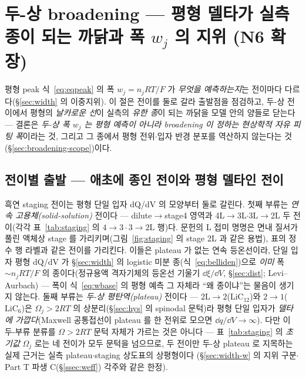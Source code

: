 \section{두-상 broadening --- 평형 델타가 실측 종이 되는 까닭과 폭 $w_j$ 의 지위 (N6 확장)}\label{sec:broadening}
평형 peak 식~\eqref{eq:eqpeak} 의 폭 $w_j=n_jRT/F$ 가 \emph{무엇을 예측하는지}는 전이마다 다르다(\S\ref{sec:width}
의 이중지위). 이 절은
전이를 둘로 갈라 출발점을 점검하고, 두-상 전이에서 평형의 \emph{날카로운 선}이 실측의 \emph{유한 종}이 되는
까닭을 모델 안의 양들로 닫는다 --- 결론은 \emph{두-상 폭 $w_j$ 는 평형 예측이 아니라 broadening 이 정하는
현상학적 자유 피팅 폭}이라는 것, 그리고 그 종에서 평형 전위$\cdot$입자 반경 분포를 역산하지 않는다는
것(\S\ref{sec:broadening-scope})이다.

\subsection{전이별 출발 --- 애초에 종인 전이와 평형 델타인 전이}\label{sec:broadening-class}
흑연 staging 전이는 평형 단일 입자 dQ/dV 의 모양부터
둘로 갈린다. 첫째 부류는 \emph{연속 고용체(solid-solution)} 전이다 --- dilute$\to$stage4 영역과
4L$\to$3L$\cdot$3L$\to$2L 두 전이(각각 표~\ref{tab:staging} 의 $4\!\to\!3\cdot3\!\to\!2\mathrm L$ 행)다. 문헌의 L 접미 명명은 면내 질서가 풀린
액체상 stage 를 가리키며(그림~\ref{fig:staging} 의 stage 2L 과 같은 용법), 표의 정수 행 라벨과 같은 전이를
가리킨다. 이들은 plateau 가 없는 연속 등온선이라\cite{rsc2021}, 단일 입자 평형 dQ/dV 가 \S\ref{sec:width} 의 logistic 미분
종(식~\eqref{eq:belliden})으로 \emph{이미} 폭 $\sim n_jRT/F$ 의 종이다(정규용액 격자기체의 등온선 기울기
$\dd\xi/\dd V$, \S\ref{sec:dist}; Levi--Aurbach\cite{leviaurbach1999}) --- 폭이 식~\eqref{eq:wbase} 의 평형
예측 그 자체라 ``왜 종이냐''는 물음이 생기지 않는다. 둘째 부류는 \emph{두-상 평탄역(plateau)} 전이다 ---
$2\mathrm L\!\to\!2$($\mathrm{LiC_{12}}$)와 $2\!\to\!1$($\mathrm{LiC_6}$)은 $\Omega_j>2RT$ 의 상분리(\S\ref{sec:hys}
의 spinodal 문턱)라 평형 단일 입자가 \emph{델타에 가깝다}(Maxwell 공통접선이 plateau 를 한 전위로 모으면
$\dd q/\dd V\!\to\!\infty$). 다만 이 두-부류 분류를 $\Omega>2RT$ 문턱 자체가 가르는 것은 아니다 ---
표~\ref{tab:staging} 의 \emph{초기값} $\Omega_j$ 로는 네 전이가 모두 문턱을 넘으므로, 두 전이만 두-상
plateau 로 지목하는 실제 근거는 실측 plateau$\cdot$staging 상도표의 상평형이다\cite{dahn1991,ohzuku1993}
(\S\ref{sec:width-w} 의 지위 구분$\cdot$Part T 파생 C(\S\ref{ssec:weff}) 각주와 같은 한정).

